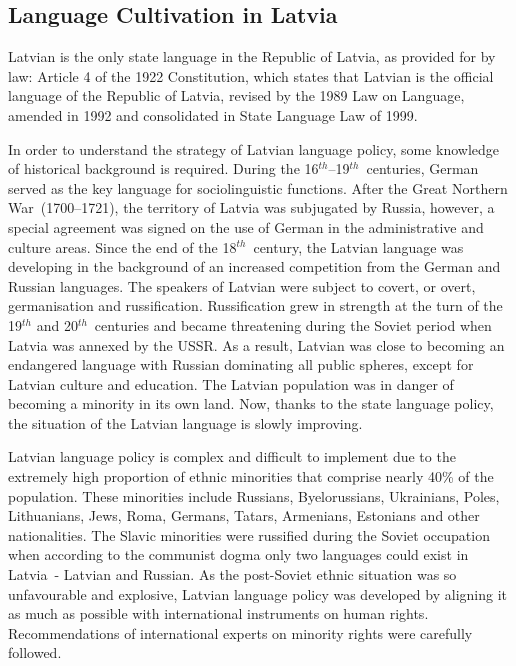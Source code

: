 \begin{multicols}{2}
\subsection{Language Cultivation in Latvia}


Latvian is the only state language in the Republic of Latvia, as provided for by law: Article 4 of the 1922 Constitution, which states that Latvian is the official language of the Republic of Latvia, revised by the 1989 Law on Language, amended in 1992 and consolidated in State Language Law of 1999.

In order to understand the strategy of Latvian language policy, some knowledge of historical background is required.
During the 16${}^{th}$--19${}^{th}$~centuries, German served as the key language for sociolinguistic functions.
After the Great Northern War~(1700--1721), the territory of Latvia was subjugated by Russia, however, a special agreement was signed on the use of German in the administrative and culture areas.
Since the end of the 18${}^{th}$~century, the Latvian language was developing in the background of an increased competition from the German and Russian languages.
The speakers of Latvian were subject to covert, or overt, germanisation and russification.
Russification grew in strength at the turn of the 19${}^{th}$ and 20${}^{th}$~centuries and became threatening during the Soviet period when Latvia was annexed by the USSR.
As a result, Latvian was close to becoming an endangered language with Russian dominating all public spheres, except for Latvian culture and education.
The Latvian population was in danger of becoming a minority in its own land.
Now, thanks to the state language policy, the situation of the Latvian language is slowly improving.


Latvian language policy is complex and difficult to implement due to the extremely high proportion of ethnic minorities that comprise nearly 40\% of the population.
These minorities include Russians, Byelorussians, Ukrainians, Poles, Lithuanians, Jews, Roma, Germans, Tatars, Armenians, Estonians and other nationalities.
The Slavic minorities were russified during the Soviet occupation when according to the communist dogma only two languages could exist in Latvia~- Latvian and Russian.
As the post-Soviet ethnic situation was so unfavourable and explosive, Latvian language policy was developed by aligning it as much as possible with international instruments on human rights.
Recommendations of international experts on minority rights were carefully followed. 


\end{multicols}

